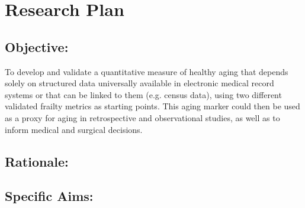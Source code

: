 \section{Research Plan }\label{research-plan}


\subsection{Objective:}\label{objective}
  
To develop and validate a quantitative measure of healthy aging that depends solely on structured data universally available in electronic medical record systems or that can be linked to them (e.g. census data),
using two different validated frailty metrics as starting points. This
aging marker could then be used as a proxy for aging in retrospective
and observational studies, as well as to inform medical and surgical
decisions.


\subsection{Rationale:}\label{rationale}

\subsection{Specific Aims:}\label{specific-aims}
